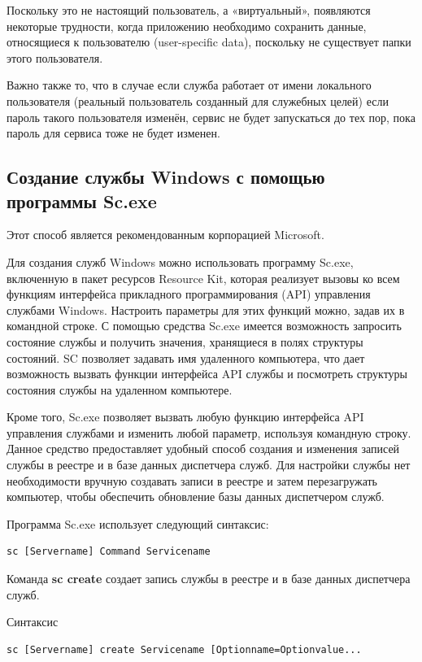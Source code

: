 Поскольку это не настоящий пользователь, а «виртуальный», появляются некоторые трудности, когда приложению необходимо сохранить данные, относящиеся к пользователю (user-specific data), поскольку не существует папки этого пользователя.

Важно также то, что в случае если служба работает от имени локального пользователя (реальный пользователь созданный для служебных целей) если пароль такого пользователя изменён, сервис не будет запускаться до тех пор, пока пароль для сервиса тоже не будет изменен.

\subsection{Создание службы Windows с помощью программы Sc.exe}

Этот способ является рекомендованным корпорацией Microsoft\cite{Cit6}.

Для создания служб Windows можно использовать программу Sc.exe, включенную в пакет ресурсов Resource Kit, которая реализует вызовы ко всем функциям интерфейса прикладного программирования (API) управления службами Windows. Настроить параметры для этих функций можно, задав их в командной строке. С помощью средства Sc.exe имеется возможность запросить состояние службы и получить значения, хранящиеся в полях структуры состояний. SC позволяет задавать имя удаленного компьютера, что дает возможность вызвать функции интерфейса API службы и посмотреть структуры состояния службы на удаленном компьютере.

Кроме того, Sc.exe позволяет вызвать любую функцию интерфейса API управления службами и изменить любой параметр, используя командную строку. Данное средство предоставляет удобный способ создания и изменения записей службы в реестре и в базе данных диспетчера служб. Для настройки службы нет необходимости вручную создавать записи в реестре и затем перезагружать компьютер, чтобы обеспечить обновление базы данных диспетчером служб.

Программа Sc.exe использует следующий синтаксис:

\begin{Verbatim}[frame=single]
sc [Servername] Command Servicename
\end{Verbatim}

Команда \textbf{sc create} создает запись службы в реестре и в базе данных диспетчера служб.

Синтаксис
\begin{Verbatim}[frame=single]
sc [Servername] create Servicename [Optionname=Optionvalue...
\end{Verbatim}

